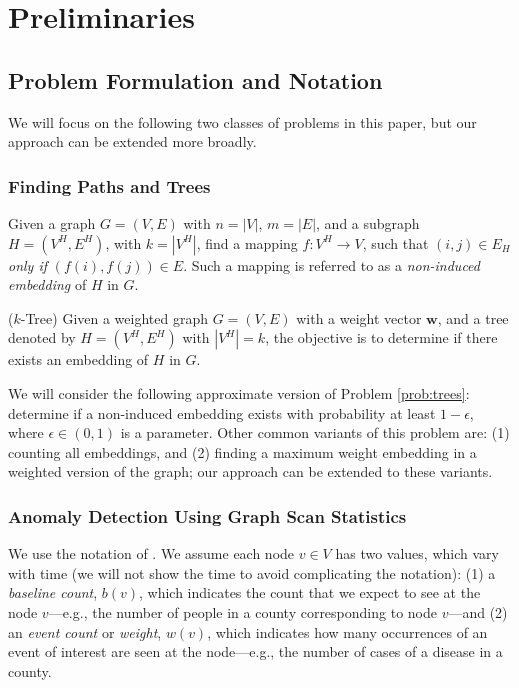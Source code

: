 \section{Preliminaries}
\label{sec:prelim}

\subsection{Problem Formulation and Notation}
We will focus on the following two classes of problems in this paper, but our
approach can be extended more broadly.

\noindent
\subsubsection{Finding Paths and Trees}
Given a graph $G=(V, E)$ with $n=|V|$, $m=|E|$, and a subgraph $H=(V^H, E^H)$, with $k=|V^H|$, find a mapping $f:V^H\rightarrow V$,
such that $(i, j)\in E_H$ \emph{only if} $(f(i), f(j))\in E$. Such a mapping is referred to as a \emph{non-induced embedding} of $H$ in $G$.

\begin{problem} ($k$-Tree)
\label{prob:trees}
Given a weighted graph $G=(V, E)$ with a weight vector $\mathbf{w}$, and a tree
denoted by $H=(V^H, E^H)$ with $|V^H|=k$, the objective is to determine if there exists
an embedding of $H$ in $G$.
\end{problem}

We will consider the following approximate version of Problem \ref{prob:trees}: determine if a non-induced embedding exists with probability at least $1-\epsilon$, where $\epsilon\in(0, 1)$ is a parameter.
Other common variants of this problem are: (1) counting all embeddings, and (2) finding a maximum
weight embedding in a weighted version of the graph; our approach can be extended to
these variants.


\noindent
\subsubsection{Anomaly Detection Using Graph Scan Statistics}
We use the notation of \cite{cadena:sdm17}. We assume each node $v\in V$ has two values,
which vary with time (we will not show the time to avoid complicating the notation):
(1) a \emph{baseline count}, $b(v)$, which indicates the count that we
expect to see at the node $v$---e.g., the number of people in a county corresponding to node $v$---and
(2) an \emph{event count} or \emph{weight}, $w(v)$, which indicates how many occurrences of an event
of interest are seen at the node---e.g., the number of cases of a disease in a county.

